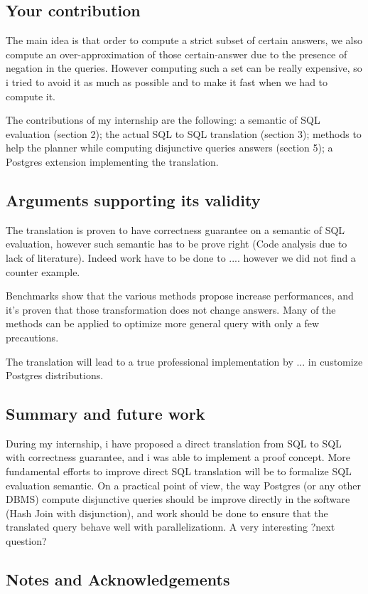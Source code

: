 \documentclass{article}
\newenvironment{point}[1]%
{\subsection*{#1}}%
{}
\begin{document}
\begin{point}{Your contribution}

The main idea is that order to compute a strict subset of certain answers, we also compute an over-approximation of those certain-answer due to the presence of negation in the queries. However computing such a set can be really expensive, so i tried to avoid it as much as possible and to make it fast when we had to compute it.

The contributions of my internship are the following: a semantic of SQL evaluation (section 2); the actual SQL to SQL translation (section 3); methods to help the planner while computing disjunctive queries answers (section 5); a Postgres extension implementing the translation. 
\end{point}

\begin{point}{Arguments supporting its validity}
 
  The translation is proven to have correctness guarantee on a semantic of SQL evaluation, however such semantic has to be prove right (Code analysis due to lack of literature). Indeed work have to be done to .... however we did not find a counter example.
  
  Benchmarks show that the various methods propose increase performances, and it's proven that those transformation does not change answers. Many of the methods can be applied to optimize more general query with only a few precautions.
  
  The translation will lead to a true professional implementation by ... in  customize Postgres distributions.
\end{point}


\begin{point}{Summary and future work}
  
 During my internship, i have proposed a direct translation from SQL to SQL with correctness guarantee, and i was able to implement a proof concept. More fundamental efforts to improve direct SQL translation will be to formalize SQL evaluation semantic. On a practical point of view, the way Postgres (or any other DBMS) compute disjunctive queries should be improve directly in the software (Hash Join with disjunction), and work should be done to ensure that the translated query behave well with parallelizationn.
  A very interesting ?next question? 

\end{point}

\begin{point}{Notes and Acknowledgements}
\end{point}
\end{document}
